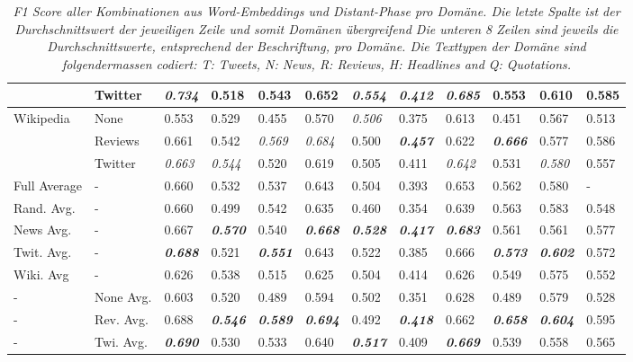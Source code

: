 \begin{table}[]
\begin{adjustbox}{max width=\textwidth}
\begin{tabular}{l|l|l|l|l|l|l|l|l|l|l||l|}
			& Twitter 	&  \textbf{\textit{0.734}} & 0.518 & 0.543 & 0.652 & \textbf{\textit{0.554}} & \textit{0.412} & \textit{0.685} & 0.553 & 0.610&0.585 \\
			\hline
			\multirow{3}{*}{Wikipedia}
			& None 		&  0.553 & 0.529 & 0.455 & 0.570 & \textit{0.506} & 0.375 & 0.613 & 0.451 & 0.567&0.513 \\
			& Reviews	&  0.661 & 0.542 & \textit{0.569} & \textit{0.684} & 0.500 & \textbf{\textit{0.457}} & 0.622 & \textbf{\textit{0.666}} & 0.577& 0.586\\
			& Twitter 	&  \textit{0.663} & \textit{0.544} & 0.520 & 0.619 & 0.505 & 0.411 & \textit{0.642} & 0.531 & \textit{0.580}&0.557 \\
			\hline
			\hline
			Full Average    & - & 0.660 & 0.532 & 0.537 & 0.643 & 0.504 & 0.393 & 0.653 & 0.562 & 0.580 & -\\
			\hline
			Rand. Avg. & - & 0.660& 0.499&	0.542 & 0.635 & 0.460 & 0.354 & 0.639 &	0.563&	0.583 & 0.548\\
			News Avg.  & - & 0.667& \textbf{\textit{0.570}} & 0.540& \textbf{\textit{0.668}} & \textbf{\textit{0.528}} & \textbf{\textit{0.417}} & \textbf{\textit{0.683}} & 0.561 & 0.561 & 0.577\\
			Twit. Avg. & - & \textbf{\textit{0.688}} & 0.521& \textbf{\textit{0.551}} & 0.643& 0.522 & 0.385& 0.666& \textbf{\textit{0.573}} & \textbf{\textit{0.602}} & 0.572\\
			Wiki. Avg  & - & 0.626& 0.538&	0.515&	0.625&	0.504&	0.414&	0.626&	0.549&	0.575&	0.552\\
			\hline
			- & None Avg. & 0.603&	0.520&	0.489&	0.594&	0.502&	0.351&	0.628&	0.489&	0.579&	0.528\\
			- & Rev. Avg. & 0.688&	\textbf{\textit{0.546}}&	\textbf{\textit{0.589}}&	\textbf{\textit{0.694}}&	0.492&	\textbf{\textit{0.418}}&	0.662&	\textbf{\textit{0.658}}&	\textbf{\textit{0.604}}&	0.595\\
			-  & Twi. Avg. & \textbf{\textit{0.690}}&	0.530&	0.533&	0.640&	\textbf{\textit{0.517}}&	0.409&	\textbf{\textit{0.669}}&	0.539&	0.558&	0.565\\
			\hline
		\end{tabular}
	\end{adjustbox}
	\caption{\textit{F1 Score aller Kombinationen aus Word-Embeddings und Distant-Phase pro Domäne. Die letzte Spalte ist der Durchschnittswert der jeweiligen Zeile und somit Domänen übergreifend Die unteren 8 Zeilen sind jeweils die Durchschnittswerte, entsprechend der Beschriftung, pro Domäne. Die Texttypen der Domäne sind folgendermassen codiert: T: Tweets, N: News, R: Reviews, H: Headlines and Q: Quotations.}}
	\label{tbl:word_embeddings}
\end{table}

